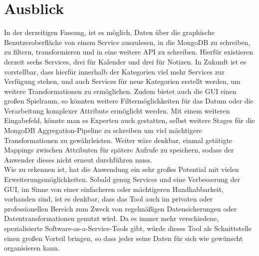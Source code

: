 \section{Ausblick}
In der derzeitigen Fassung, ist es möglich, Daten über die graphische Benutzeroberfläche von einem Service auszulesen, in die MongoDB zu schreiben, zu filtern, transformieren und in eine weitere API zu schreiben. Hierfür existieren derzeit sechs Services, drei für Kalender und drei für Notizen. In Zukunft ist es vorstellbar, dass hierfür innerhalb der Kategorien viel mehr Services zur Verfügung stehen, und auch Services für neue Kategorien erstellt werden, um weitere Transformationen zu ermöglichen. Zudem bietet auch die GUI einen großen Spielraum, so könnten weitere Filtermöglichkeiten für das Datum oder die Verarbeitung komplexer Attribute ermöglicht werden. Mit einem weiteren Eingabefeld, könnte man es Experten auch gestatten, selbst weitere Stages für die MongoDB Aggregation-Pipeline zu schreiben um viel mächtigere Transformationen zu gewährleisten. Weiter wäre denkbar, einmal getätigte Mappings zwischen Attributen für spätere Aufrufe zu speichern, sodass der Anwender dieses nicht erneut durchführen muss. \\
Wie zu erkennen ist, hat die Anwendung ein sehr großes Potential mit vielen Erweiterungsmöglichkeiten. Sobald genug Services und eine Verbesserung der GUI, im Sinne von einer einfacheren oder mächtigeren Handhabbarkeit, vorhanden sind, ist es denkbar, dass das Tool auch im privaten oder professionellen Bereich zum Zweck von regelmäßigen Datensicherungen oder Datentransformationen genutzt wird. Da es immer mehr verschiedene, spezialisierte Software-as-a-Service-Tools gibt, würde dieses Tool als Schnittstelle einen großen Vorteil bringen, so dass jeder seine Daten für sich wie gewünscht organisieren kann.
